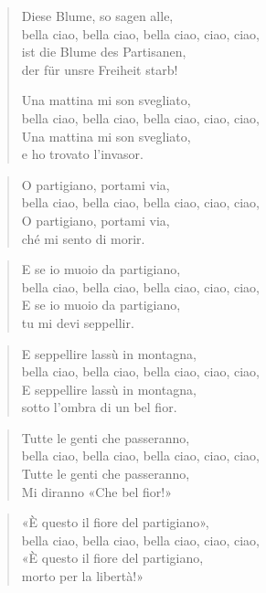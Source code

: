 \documentclass[9pt,a4paper,oneside, onecolumn]{article}
\begin{document}
\begin{multicols}{2}
\begin{verse}
Diese Blume, so sagen alle,\\
bella ciao, bella ciao, bella ciao, ciao, ciao,\\
ist die Blume des Partisanen,\\
der für unsre Freiheit starb!\\
\begin{verse}

\columnbreak

\end{verse}
Una mattina mi son svegliato,\\
bella ciao, bella ciao, bella ciao, ciao, ciao,\\
Una mattina mi son svegliato,\\
e ho trovato l'invasor.\\
\end{verse}

\begin{verse}
O partigiano, portami via,\\
bella ciao, bella ciao, bella ciao, ciao, ciao,\\
O partigiano, portami via,\\
ché mi sento di morir.\\
\end{verse}

\begin{verse}
E se io muoio da partigiano,\\
bella ciao, bella ciao, bella ciao, ciao, ciao,\\
E se io muoio da partigiano,\\
tu mi devi seppellir.\\
\end{verse}

\begin{verse}
E seppellire lassù in montagna,\\
bella ciao, bella ciao, bella ciao, ciao, ciao,\\
E seppellire lassù in montagna,\\
sotto l'ombra di un bel fior.\\
\end{verse}

\begin{verse}
Tutte le genti che passeranno,\\
bella ciao, bella ciao, bella ciao, ciao, ciao,\\
Tutte le genti che passeranno,\\
Mi diranno «Che bel fior!»\\
\end{verse}

\begin{verse}
«È questo il fiore del partigiano»,\\
bella ciao, bella ciao, bella ciao, ciao, ciao,\\
«È questo il fiore del partigiano,\\
morto per la libertà!»\\
\end{verse}

\end{multicols}
\end{document}
